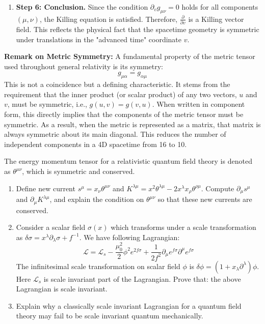 \begin{solution}
\begin{enumerate}
    \item \textbf{Step 6: Conclusion.}
    Since the condition $\partial_v g_{\mu\nu} = 0$ holds for all components $(\mu, \nu)$, the Killing equation is satisfied. Therefore, $\frac{\partial}{\partial v}$ is a Killing vector field. This reflects the physical fact that the spacetime geometry is symmetric under translations in the "advanced time" coordinate $v$.
\end{enumerate}
\end{solution}

\textbf{Remark on Metric Symmetry:}
A fundamental property of the metric tensor used throughout general relativity is its symmetry:
\[ g_{\mu\alpha} = g_{\alpha\mu} \]
This is not a coincidence but a defining characteristic. It stems from the requirement that the inner product (or scalar product) of any two vectors, $u$ and $v$, must be symmetric, i.e., $g(u, v) = g(v, u)$. When written in component form, this directly implies that the components of the metric tensor must be symmetric. As a result, when the metric is represented as a matrix, that matrix is always symmetric about its main diagonal. This reduces the number of independent components in a 4D spacetime from 16 to 10.

\begin{exercise}
\label{physics:2022:5}
The energy momentum tensor for a relativistic quantum field theory is denoted as $\theta^{\mu\nu}$, which is symmetric and conserved.

\begin{enumerate}[label=(\alph*)]
    \item Define new current $s^\mu = x_\nu \theta^{\mu\nu}$ and $K^{\lambda\mu} = x^2 \theta^{\lambda\mu} - 2x^\lambda x_\rho \theta^{\rho\mu}$. Compute $\partial_\mu s^\mu$ and $\partial_\mu K^{\lambda\mu}$, and explain the condition on $\theta^{\mu\nu}$ so that these new currents are conserved.
    \item Consider a scalar field $\sigma(x)$ which transforms under a scale transformation as $\delta \sigma = x^\lambda \partial_\lambda \sigma + f^{-1}$. We have following Lagrangian:
    \begin{equation}
        \mathcal{L} = \mathcal{L}_s - \frac{\mu_0^2}{2} \phi^2 e^{2f\sigma} + \frac{1}{2f^2} \partial_\mu e^{f\sigma} \partial^\mu e^{f\sigma}
    \end{equation}
    The infinitesimal scale transformation on scalar field $\phi$ is $\delta \phi = (1 + x_\lambda \partial^\lambda)\phi$. Here $\mathcal{L}_s$ is scale invariant part of the Lagrangian. Prove that: the above Lagrangian is scale invariant.
    \item Explain why a classically scale invariant Lagrangian for a quantum field theory may fail to be scale invariant quantum mechanically.
\end{enumerate}
\end{exercise}

